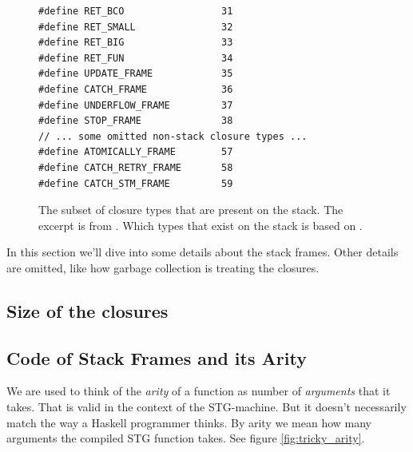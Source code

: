 \begin{figure}
\begin{mdframed}
  \begin{verbatim}
#define RET_BCO                 31
#define RET_SMALL               32
#define RET_BIG                 33
#define RET_FUN                 34
#define UPDATE_FRAME            35
#define CATCH_FRAME             36
#define UNDERFLOW_FRAME         37
#define STOP_FRAME              38
// ... some omitted non-stack closure types ...
#define ATOMICALLY_FRAME        57
#define CATCH_RETRY_FRAME       58
#define CATCH_STM_FRAME         59
  \end{verbatim}
  \caption{The subset of closure types that are present on the stack.
The excerpt is from \cite{github_closure_types}. Which types that exist
on the stack is based on \cite{github_scavenge_stack}.}
  \label{fig:stack_types}
\end{mdframed}
\end{figure}


In this section we'll dive into
some details about the stack frames. Other details
are omitted, like how garbage collection is treating the closures.

\subsection{Size of the closures}








\subsection{Code of Stack Frames and its Arity}

We are used to think of the \emph{arity} of a function as number
of \emph{arguments} that it takes. That is valid in the context of the
STG-machine. But it doesn't necessarily match the way a Haskell
programmer thinks. By arity we mean how many arguments the compiled
STG function takes. See figure \ref{fig:tricky_arity}. \cite{commentary_function_calls}

